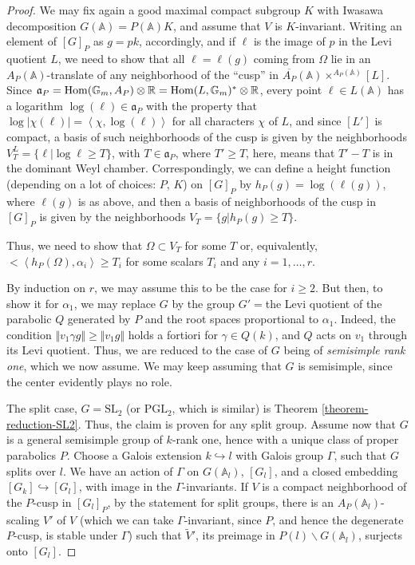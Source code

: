 \begin{proof}
 We may fix again a good maximal compact subgroup $K$ with Iwasawa decomposition $G(\mathbb A) = P(\mathbb A)K$, and assume that $V$ is $K$-invariant. Writing an element of $[G]_P$ as $g=pk$, accordingly, and if $\ell$ is the image of $p$ in the Levi quotient $L$, we need to show that all $\ell = \ell(g)$ coming from $\Omega$ lie in an $A_P(\mathbb A)$-translate of any neighborhood of the ``cusp'' in $\overline{A_P}(\mathbb A)\times^{A_P(\mathbb A)} [L]$. Since $\mathfrak a_P = \mathop{\rm Hom}\nolimits(\mathbb G_m,A_P)\otimes\mathbb R = \mathop{\rm Hom}\nolimits(L, \mathbb G_m)^*\otimes\mathbb R$, every point $\ell \in L(\mathbb A)$ has a logarithm $\log(\ell) \in \mathfrak a_P$ with the property that $\log |\chi(\ell)| = \left< \chi, \log(\ell)\right>$ for all characters $\chi$ of $L$, and since $[L']$ is compact, a basis of such neighborhoods of the cusp is given by the neighborhoods $V^L_T=\{ \ell| \log \ell \ge T\}$, with $T\in\mathfrak a_P$, where $ T'\ge T$, here,  means that $T'-T$ is in the dominant Weyl chamber. Correspondingly, we can define a height function (depending on a lot of choices: $P$, $K$) on $[G]_P$ by $h_P(g) = \log (\ell(g))$, where $\ell(g)$ is as above, and then a basis of neighborhoods of the cusp in $[G]_P$ is given by the neighborhoods $V_T=\{ g | h_P(g)  \ge T\}$. 
 
 Thus, we need to show that $\Omega\subset V_T$ for some $T$ or, equivalently, $<\left < h_P(\Omega), \alpha_i\right> \ge T_i$ for some scalars $T_i$ and any $i=1,\dots ,r$. 
 
 By induction on $r$, we may assume this to be the case for $i \ge 2$. But then, to show it for $\alpha_1$, we may replace $G$ by the group $G'=$the Levi quotient of the parabolic $Q$ generated by $P$ and the root spaces proportional to $\alpha_1$. Indeed, the condition $\Vert v_1 \gamma g \Vert \ge \Vert v_1 g\Vert$ holds a fortiori for $\gamma \in Q (k)$, and $Q$ acts on $v_1$ through its Levi quotient. Thus, we are reduced to the case of $G$ being of \emph{semisimple rank one}, which we now assume. We may keep assuming that $G$ is semisimple, since the center evidently plays no role.
 
 The split case, $G = \text{SL}_2$ (or $\text{PGL}_2$, which is similar) is Theorem \ref{theorem-reduction-SL2}. Thus, the claim is proven for any split group. Assume now that $G$ is a general semisimple group of $k$-rank one, hence with a unique class of proper parabolics $P$. Choose a Galois extension $k\hookrightarrow l$ with Galois group $\Gamma$, such that $G$ splits over $l$. We have an action of $\Gamma$ on $G(\mathbb A_l)$, $[G_l]$, and a closed embedding $[G_k]\hookrightarrow [G_l]$, with image in the $\Gamma$-invariants. If $V$ is a compact neighborhood of the $P$-cusp in $[G_l]_P$, by the statement for split groups, there is an $A_P(\mathbb A_l)$-scaling $V'$ of $V$ (which we can take $\Gamma$-invariant, since $P$, and hence the degenerate $P$-cusp, is stable under $\Gamma$) such that $\tilde V'$, its preimage in $P(l)\backslash G(\mathbb A_l)$, surjects onto $[G_l]$. 
 

\end{proof}
